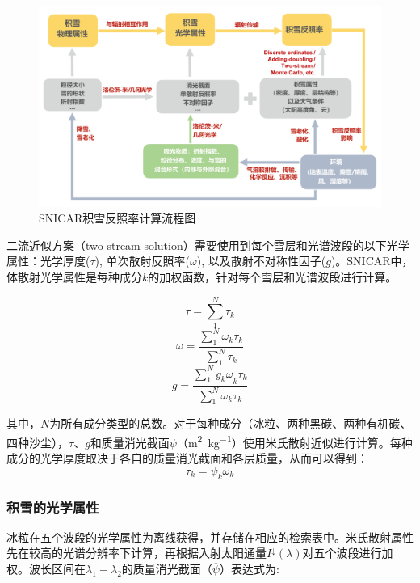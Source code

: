 {
  \begin{figure}[htbp]
    \centering
    \includegraphics[width=1\columnwidth]{Figures/辐射过程及辐射通量计算/SNICAR模型计算流程图_v2.png}
    \caption[SNICAR积雪反照率计算流程图]{SNICAR积雪反照率计算流程图\citep{he2020SnowAlbedoRadiative}}
    \label{fig:SNICAR模型流程图}
  \end{figure}
}

二流近似方案（two-stream
solution）需要使用到每个雪层和光谱波段的以下光学属性：光学厚度($\tau$),
单次散射反照率($\omega$),
以及散射不对称性因子($g$)。SNICAR中，体散射光学属性是每种成分$k$的加权函数，针对每个雪层和光谱波段进行计算。

\begin{equation}
  \tau = \sum_{1}^{N}\tau_{k}
\end{equation}
%
\begin{equation}
  \omega = \frac{\sum_{1}^{N}\omega_{k}\tau_{k}}{\sum_{1}^{N}\tau_{k}}
\end{equation}
%
\begin{equation}
  g = \frac{\sum_{1}^{N}{g_{k}\omega}_{k}\tau_{k}}{\sum_{1}^{N}\omega_{k}\tau_{k}}
\end{equation}

其中，$N$为所有成分类型的总数。对于每种成分（冰粒、两种黑碳、两种有机碳、四种沙尘），$\tau$、$g$和质量消光截面$\psi$（\unit{m^2.kg^{-1}}）使用米氏散射近似进行计算。每种成分的光学厚度取决于各自的质量消光截面和各层质量，从而可以得到：
\begin{equation}
  \tau_{k} = \psi_{k}\omega_{k}
\end{equation}

\subsubsection{积雪的光学属性}
冰粒在五个波段的光学属性为离线获得，并存储在相应的检索表中。米氏散射属性先在较高的光谱分辨率下计算，再根据入射太阳通量\(I^{\downarrow}(\lambda)\)对五个波段进行加权。波长区间在$\lambda_{1}-\lambda_{2}$的质量消光截面（\(\overline{\psi}\)）表达式为:

